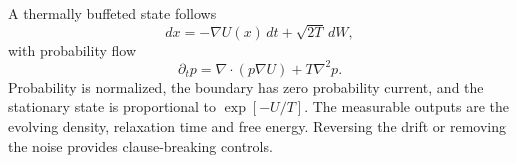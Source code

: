 A thermally buffeted state follows
\[
  d x=-\nabla U(x)\,dt+\sqrt{2T}\,dW,
\]
with probability flow
\[
  \partial_t p=\nabla\!\cdot(p\nabla U)+T\nabla^2p.
\]
Probability is normalized, the boundary has zero probability current, and the
stationary state is proportional to \(\exp[-U/T]\). The measurable outputs are
the evolving density, relaxation time and free energy. Reversing the drift or
removing the noise provides clause-breaking controls.
